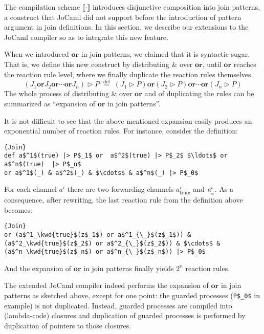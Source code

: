 \documentclass{LMCS}
\let \lst \lstinline
\newcommand{\jocaml}{\textrm{JoCaml}\xspace}
\newcommand{\kwd}[1]{\ensuremath{\mathbf{#1}}}
\newcommand{\infix}[1]{\mathrel{\kwd {#1}}}
\newcommand{\id}[1]{\textit{#1}}
\renewcommand{\_}{\mathord{\rule[-.25ex]{1ex}{.15ex}}}
\newcommand{\defineas}{\;\stackrel{\mathrm{def}}=\;}
\newcommand{\C}[1]{\llbracket#1\rrbracket}
\newcommand{\reaction}[2]{#1 \triangleright #2}
\begin{document}
The compilation scheme $\C{\cdot}$ introduces disjunctive composition
into join patterns, a construct that \jocaml did not support before
the introduction of pattern argument in join definitions. In this
section, we describe our extensions to the \jocaml compiler so as to
integrate this new feature.

When we introduced \kwd{or} in join patterns, we claimed that it is
syntactic sugar. That is, we define this new construct by distributing 
$\kwd{\&}$ over $\kwd{or}$, until \kwd{or} reaches the reaction rule
level, where we finally duplicate the reaction rules themselves.
$$
\reaction{(J_1 \infix{or} J_2 \infix{or} \cdots \infix{or} J_n)}{P}
\defineas
(\reaction{J_1}{P}) \infix{or} 
(\reaction{J_2}{P}) \infix{or} \cdots
 \infix{or} (\reaction{J_n}{P})
$$
The whole process of distributing $\kwd{\&}$ over $\kwd{or}$ and of
duplicating the rules can be summarized as ``expansion of \kwd{or} in
join patterns''.

It is not difficult to see that the above mentioned expansion easily
produces an exponential number of reaction rules.
For instance, consider the definition:
\begin{lstlisting}{Join}
def a$^1$(true) |> P$_1$ or  a$^2$(true) |> P$_2$ $\ldots$ or a$^n$(true)  |> P$_n$
or a$^1$(_) & a$^2$(_) & $\cdots$ & a$^n$(_) |> P$_0$
\end{lstlisting}
For each channel $\id{a}^i$ there are two forwarding channels
$\id{a}^i_{\kwd{true}}$ and $\id{a}^i_{\_}$.
As a consequence, after rewriting, the last reaction rule from the definition
above becomes:
\begin{lstlisting}{Join}
or (a$^1_\kwd{true}$(z$_1$) or a$^1_{\_}$(z$_1$)) & (a$^2_\kwd{true}$(z$_2$) or a$^2_{\_}$(z$_2$)) & $\cdots$ & (a$^n_\kwd{true}$(z$_n$) or a$^n_{\_}$(z$_n$)) |> P$_0$
\end{lstlisting}
And the expansion of \kwd{or} in join patterns finally yields $2^n$
reaction rules.

The extended \jocaml compiler indeed performs the expansion
of \kwd{or} in join patterns as sketched above, except for one point:
the guarded processes (\lst|P$_0$| in example) is not duplicated.
Instead, guarded processes are compiled into (lambda-code) closures
and duplication of guarded processes is performed by duplication of
pointers to those closures.
\end{document}
